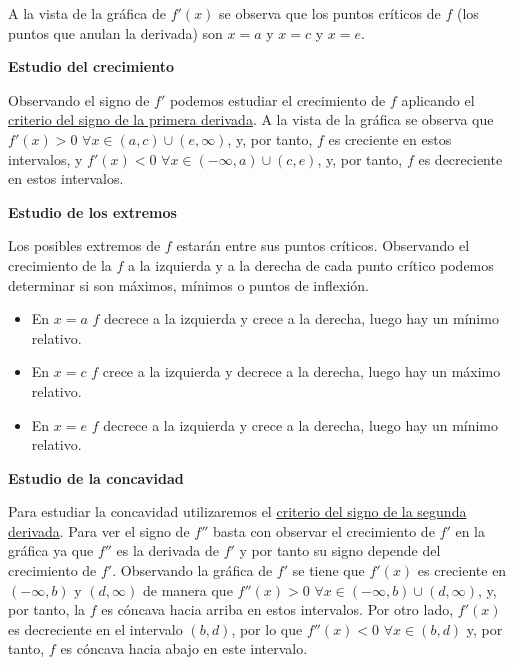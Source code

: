 \documentclass[
  spanish,
  a4paper,
]{scrreport}
\providecommand{\tightlist}{%
  \setlength{\itemsep}{0pt}\setlength{\parskip}{0pt}}
\theoremstyle{definition}
\theoremstyle{remark}
\begin{document}
\begin{tcolorbox}[enhanced jigsaw, arc=.35mm, bottomrule=.15mm, bottomtitle=1mm, breakable, colback=white, colbacktitle=quarto-callout-tip-color!10!white, colframe=quarto-callout-tip-color-frame, coltitle=black, left=2mm, leftrule=.75mm, opacityback=0, opacitybacktitle=0.6, rightrule=.15mm, title=\textcolor{quarto-callout-tip-color}{\faLightbulb}\hspace{0.5em}{Solución}, titlerule=0mm, toprule=.15mm, toptitle=1mm]

A la vista de la gráfica de \(f'(x)\) se observa que los puntos críticos
de \(f\) (los puntos que anulan la derivada) son \(x=a\) y \(x=c\) y
\(x=e\).

\textbf{Estudio del crecimiento}

Observando el signo de \(f'\) podemos estudiar el crecimiento de \(f\)
aplicando el
\href{https://aprendeconalf.es/analisis-manual/derivadas.html\#thm-crecimiento-signo-derivada}{criterio
del signo de la primera derivada}. A la vista de la gráfica se observa
que \(f'(x)>0\) \(\forall x\in (a,c)\cup (e,\infty)\), y, por tanto,
\(f\) es creciente en estos intervalos, y \(f'(x)<0\)
\(\forall x\in (-\infty, a)\cup (c,e)\), y, por tanto, \(f\) es
decreciente en estos intervalos.

\textbf{Estudio de los extremos}

Los posibles extremos de \(f\) estarán entre sus puntos críticos.
Observando el crecimiento de la \(f\) a la izquierda y a la derecha de
cada punto crítico podemos determinar si son máximos, mínimos o puntos
de inflexión.

\begin{itemize}
\tightlist
\item
  En \(x=a\) \(f\) decrece a la izquierda y crece a la derecha, luego
  hay un mínimo relativo.
\item
  En \(x=c\) \(f\) crece a la izquierda y decrece a la derecha, luego
  hay un máximo relativo.
\item
  En \(x=e\) \(f\) decrece a la izquierda y crece a la derecha, luego
  hay un mínimo relativo.
\end{itemize}

\textbf{Estudio de la concavidad}

Para estudiar la concavidad utilizaremos el
\href{https://aprendeconalf.es/analisis-manual/derivadas.html\#thm-concavidad}{criterio
del signo de la segunda derivada}. Para ver el signo de \(f''\) basta
con observar el crecimiento de \(f'\) en la gráfica ya que \(f''\) es la
derivada de \(f'\) y por tanto su signo depende del crecimiento de
\(f'\). Observando la gráfica de \(f'\) se tiene que \(f'(x)\) es
creciente en \((-\infty, b)\) y \((d,\infty)\) de manera que
\(f''(x)>0\) \(\forall x\in (-\infty, b)\cup (d,\infty)\), y, por tanto,
la \(f\) es cóncava hacia arriba en estos intervalos. Por otro lado,
\(f'(x)\) es decreciente en el intervalo \((b,d)\), por lo que
\(f''(x)<0\) \(\forall x\in(b,d)\) y, por tanto, \(f\) es cóncava hacia
abajo en este intervalo.


\end{tcolorbox}
\end{document}

